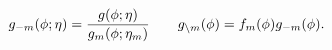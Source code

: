 \begin{equation}
  g_{-m}(\phi; \eta) = 
    \frac {
      g(\phi; \eta)
    } {
      g_{m}(\phi; \eta_{m})
    }
  \qquad
  g_{\setminus m}(\phi) = 
    f_{m}(\phi) g_{-m}(\phi).
  \label{eqn:ep-distribution-defs}
\end{equation}